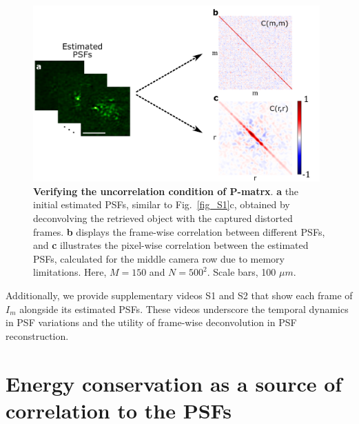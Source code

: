 \documentclass[pdflatex,sn-mathphys-num,Numbered]{sn-jnl}%
\theoremstyle{thmstyleone}%
\theoremstyle{thmstyletwo}%
\theoremstyle{thmstylethree}%
\begin{document}
\begin{figure}[hbt!]
	\centering
	\includegraphics [width=0.98\textwidth,]
	{supp_figures/figure_S1_5.pdf}
         \renewcommand{\thefigure}{S2}

    \caption{\textbf{Verifying the uncorrelation condition of P-matrx}. \textbf{a} the initial estimated PSFs, similar to Fig.~\ref{fig_S1}c, obtained by deconvolving the retrieved object with the captured distorted frames. \textbf{b} displays the frame-wise correlation between different PSFs, and \textbf{c} illustrates the pixel-wise correlation between the estimated PSFs, calculated for the middle camera row due to memory limitations. Here, $M = 150$ and $N = 500^2$. Scale bars, 100 $\mu m$.} 
    \label{fig_S1_5}
    \end{figure} 


Additionally, we provide supplementary videos S1 and S2 that show each frame of \( I_m \) alongside its estimated PSFs. These videos underscore the temporal dynamics in PSF variations and the utility of frame-wise deconvolution in PSF reconstruction.





\newpage 

\section{Energy conservation as a source of correlation to the PSFs}
\end{document}
